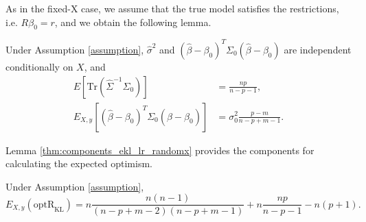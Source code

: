 As in the fixed-X case, we assume that the true model satisfies the restrictions, i.e. $R\beta_0=r$, and we obtain the following lemma.
\begin{lemma}
Under Assumption \ref{assumption}, $\hat\sigma^2$ and $(\hat{\beta}-\beta_0)^T \Sigma_0 (\hat{\beta}-\beta_0)$ are independent conditionally on $X$, and 
\begin{equation*}
\begin{aligned}
E \left[ \text{Tr}(\hat \Sigma^{-1}\Sigma_0) \right] &= \frac{np}{n-p-1},\\
E_{X,y}  \left [ (\hat \beta-\beta_0)^T \Sigma_0 (\hat \beta-\beta_0) \right ] &= \sigma_0^2 \frac{p-m}{n-p+m-1}.
\end{aligned}
\end{equation*}
\label{thm:components_ekl_lr_randomx}
\end{lemma}
Lemma \ref{thm:components_ekl_lr_randomx} provides the components for calculating the expected optimism.
\begin{theorem}
Under Assumption \ref{assumption}, 
\begin{equation*}
E_{X,y}(\text{optR}_\text{KL}) = n \frac{n(n-1)}{(n-p+m-2)(n-p+m-1)} + n \frac{np}{n-p-1} - n(p+1).
\end{equation*}
\label{thm:EoptR_KL}
\end{theorem}

